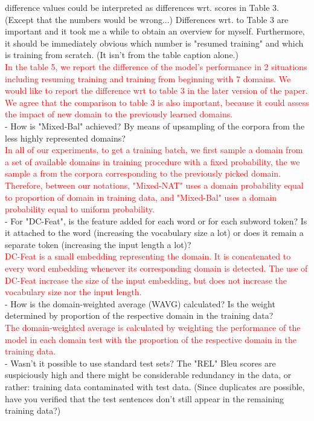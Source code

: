 \documentclass[12pt,times,a4paper,twoside]{article}
\theoremstyle{definition}
\begin{document}
difference values could be interpreted as differences wrt. scores in Table 3. (Except that the numbers would be wrong...) Differences wrt. to Table 3 are important and it took me a while to obtain an overview for myself. Furthermore, it should be immediately obvious which number is "resumed training" and which is training from scratch. (It isn't from the table caption alone.)
\\
\textcolor{red}{In the table 5, we report the difference of the model's performance in 2 situations including resuming training and training from beginning with 7 domains. We would like to report the difference wrt to table 3 in the later version of the paper. We agree that the comparison to table 3 is also important, because it could assess the impact of new domain to the previously learned domains.}
\\
- How is "Mixed-Bal" achieved? By means of upsampling of the corpora from the less highly represented domains?
\\
\textcolor{red}{In all of our experiments, to get a training batch, we first sample a domain from a set of available domains in training procedure with a fixed probability, the we sample a from the corpora corresponding to the previously picked domain. Therefore, between our notations, "Mixed-NAT" uses a domain probability equal to proportion of domain in training data, and "Mixed-Bal" uses a domain probability equal to uniform probability.}
\\
- For "DC-Feat", is the feature added for each word or for each subword token? Is it attached to the word (increasing the vocabulary size a lot) or does it remain a separate token (increasing the input length a lot)?
\\
\textcolor{red}{DC-Feat is a small embedding representing the domain. It is concatenated to every word embedding whenever its corresponding domain is detected. The use of DC-Feat increase the size of the input embedding, but does not increase the vocabulary size nor the input length.}
\\
- How is the domain-weighted average (WAVG) calculated? Is the weight determined by proportion of the respective domain in the training data?
\\
\textcolor{red}{The domain-weighted average is calculated by weighting the performance of the model in each domain test with the proportion of the respective domain in the training data.}
\\
- Wasn't it possible to use standard test sets? The "REL" Bleu scores are suspiciously high and there might be considerable redundancy in the data, or rather: training data contaminated with test data. (Since duplicates are possible, have you verified that the test sentences don't still appear in the remaining training data?)
\end{document}
